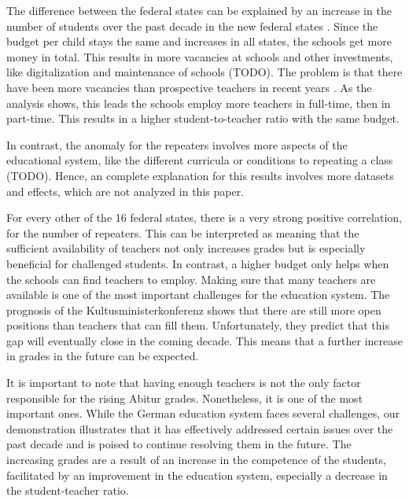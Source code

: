 The difference between the federal states can be explained by an increase in the number of students over the past decade in the new federal states \cite{thuringer_ministerium_fur_bildung_jugend_und_sport_verteilung_2023, brandenburger_ministerium_fur_bildung_jugend_und_sport_zahlen_2023,statistisches_amt_mecklenburg-vorpommern_statistik_nodate}. Since the budget per child stays the same and increases in all states, the schools get more money in total. This results in more vacancies at schools and other investments, like digitalization and maintenance of schools (TODO). The problem is that there have been more vacancies than prospective teachers in recent years \cite{kultusminister_konferenz_lehrkrafteeinstellungsbedarf_2023}. As the analysis shows, this leads the schools employ more teachers in full-time, then in part-time. This results in a higher student-to-teacher ratio with the same budget.

In contrast, the anomaly for the repeaters involves more aspects of the educational system, like the different curricula or conditions to repeating a class (TODO). Hence, an complete explanation for this results involves more datasets and effects, which are not analyzed in this paper.


For every other of the 16 federal states, there is a very strong positive correlation, for the number of repeaters. This can be interpreted as meaning that the sufficient availability of teachers not only increases grades but is especially beneficial for challenged students. In contrast, a higher budget only helps when the schools can find teachers to employ. Making sure that many teachers are available is one of the most important challenges for the education system. The prognosis of the Kultusministerkonferenz \cite{kultusminister_konferenz_lehrkrafteeinstellungsbedarf_2023} shows that there are still more open positions than teachers that can fill them. Unfortunately, they predict that this gap will eventually close in the coming decade. This means that a further increase in grades in the future can be expected.

It is important to note that having enough teachers is not the only factor responsible for the rising Abitur grades. Nonetheless, it is one of the most important ones. While the German education system faces several challenges, our demonstration illustrates that it has effectively addressed certain issues over the past decade and is poised to continue resolving them in the future. The increasing grades are a result of an increase in the competence of the students, facilitated by an improvement in the education system, especially a decrease in the student-teacher ratio.
